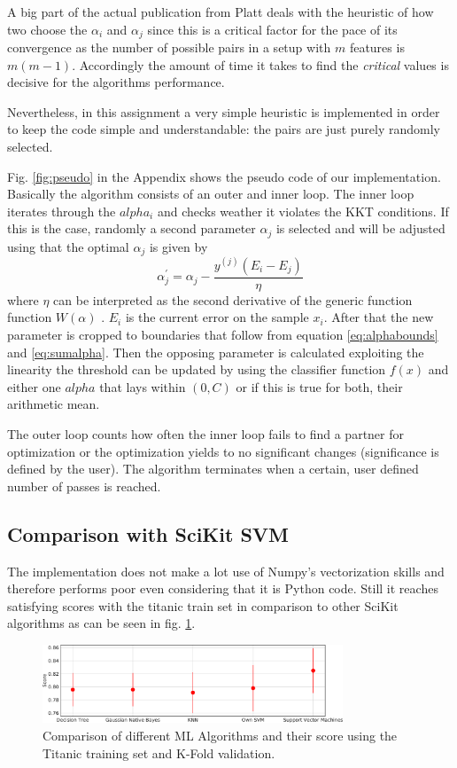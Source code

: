A big part of the actual publication from Platt deals with the heuristic of how two choose the $\alpha _i$ and $\alpha _j$ since this is a critical factor for the pace of its convergence as the number of possible pairs in a setup with $m$ features is $m(m-1)$. Accordingly the amount of time it takes to find the \textit{critical} values is decisive for the algorithms performance.

Nevertheless, in this assignment a very simple heuristic is implemented in order to keep the code simple and understandable: the pairs are just purely randomly selected.

Fig. \ref{fig:pseudo} in the Appendix shows the pseudo code of our implementation. Basically the algorithm consists of an outer and inner loop. The inner loop iterates through the $alpha _i$ and checks weather it violates the KKT conditions. If this is the case, randomly a second parameter $\alpha _j$ is selected and will be adjusted using that the optimal $\alpha _j$ is given by
\begin{equation}
\alpha^{'}_j = \alpha _j  - \frac{y^{(j)} (E_i - E_j)}{\eta}
\end{equation}
where $\eta$ can be interpreted as the second derivative of the generic function function $W(\alpha)$ \cite{smo}. $E_i$ is the current error on the sample $x_i$. After that the new parameter is cropped to boundaries that follow from equation \ref{eq:alphabounds} and \ref{eq:sumalpha}. Then the opposing parameter is calculated exploiting the linearity the threshold can be updated by using the classifier function $f(x)$ and either one $alpha$ that lays within $(0, C)$ or if this is true for both, their arithmetic mean.

The outer loop counts how often the inner loop fails to find a partner for optimization or the optimization yields to no significant changes (significance is defined by the user). The algorithm terminates when a certain, user defined number of passes is reached.

\subsection{Comparison with SciKit SVM}
The implementation does not make a lot use of Numpy's vectorization skills and therefore performs poor even considering that it is Python code. Still it reaches satisfying scores with the titanic train set in comparison to other SciKit algorithms as can be seen in fig. \ref{fig:comparison}.

\begin{figure}
  \centering
    \includegraphics[width=0.8\textwidth]{media_saved/ml_comparison}
  \caption{Comparison of different ML Algorithms and their score using the Titanic training set and K-Fold validation.}  
  \label{fig:comparison}  
\end{figure}

